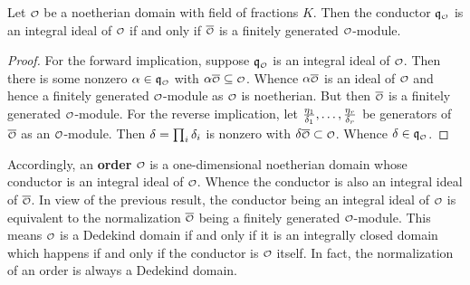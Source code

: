     \begin{proposition}\label{prop:conductor_integral_ideal_equivalence}
      Let \(\smc{O}\) be a noetherian domain with field of fractions \(K\). Then the conductor \(\mf{q}_{\smc{O}}\) is an integral ideal of \(\smc{O}\) if and only if \(\conj{\smc{O}}\) is a finitely generated \(\smc{O}\)-module.
    \end{proposition}
    \begin{proof}
      For the forward implication, suppose \(\mf{q}_{\smc{O}}\) is an integral ideal of \(\smc{O}\). Then there is some nonzero \(\a \in \mf{q}_{\smc{O}}\) with \(\a\conj{\smc{O}} \subseteq \smc{O}\). Whence \(\a\conj{\smc{O}}\) is an ideal of \(\smc{O}\) and hence a finitely generated \(\smc{O}\)-module as \(\smc{O}\) is noetherian. But then \(\conj{\smc{O}}\) is a finitely generated \(\smc{O}\)-module. For the reverse implication, let \(\frac{\eta_{1}}{\delta_{1}},\ldots,\frac{\eta_{r}}{\delta_{r}}\) be generators of \(\conj{\smc{O}}\) as an \(\smc{O}\)-module. Then \(\delta = \prod_{i}\delta_{i}\) is nonzero with \(\d\conj{\smc{O}} \subset \smc{O}\). Whence \(\d \in \mf{q}_{\smc{O}}\).
    \end{proof}
    
    Accordingly, an \textbf{order} \(\smc{O}\) is a one-dimensional noetherian domain whose conductor is an integral ideal of \(\smc{O}\). Whence the conductor is also an integral ideal of \(\conj{\smc{O}}\). In view of the previous result, the conductor being an integral ideal of \(\smc{O}\) is equivalent to the normalization \(\conj{\smc{O}}\) being a finitely generated \(\smc{O}\)-module. This means \(\smc{O}\) is a Dedekind domain if and only if it is an integrally closed domain which happens if and only if the conductor is \(\smc{O}\) itself. In fact, the normalization of an order is always a Dedekind domain.


